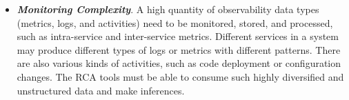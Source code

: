 \begin{itemize}
    \item \textbf{\emph{Monitoring Complexity}}. A high quantity of observability data types (metrics, logs, and activities) need to be monitored, stored, and processed, such as intra-service and inter-service metrics. Different services in a system may produce different types of logs or metrics with different patterns. There are also various kinds of activities, such as code deployment or configuration changes. The RCA tools must be able to consume such highly diversified and unstructured data and make inferences. %




\end{itemize}


